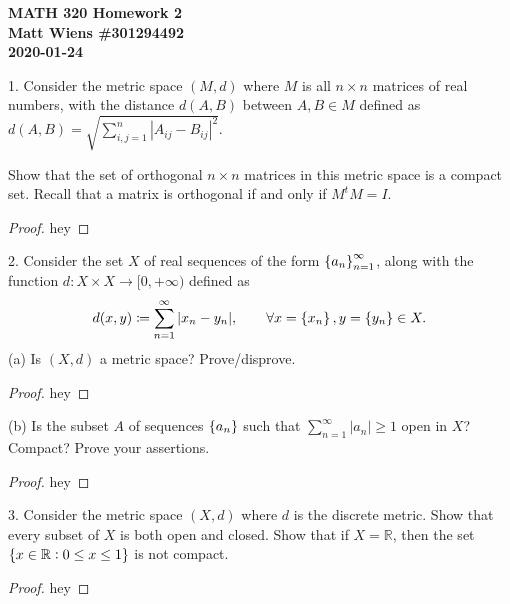 \documentclass{article}
\newcommand{\R}{\mathbb{R}}
\begin{document}
\textbf{MATH 320 Homework 2} \\
\textbf{Matt Wiens \#301294492} \\
\textbf{2020-01-24}

1. Consider the metric space $(M, d)$ where $M$ is all $n \times n$
matrices of real numbers, with the distance $d(A, B)$ between $A, B
\in M$ defined as $d(A, B)= \sqrt{\sum_{i, j = 1}^n |A_{i j} - B_{i j}|^2}$.

Show that the set of orthogonal $n \times n$ matrices in this metric
space is a compact set. Recall that a matrix is orthogonal if and only
if $M^t M = I$.

\begin{proof}

hey

\end{proof}

\newpage

2. Consider the set $X$ of real sequences of the form $\cbr{a_n}_{ n=
   1}^\infty$, along with the function $d: X \times X \rightarrow [0,
   +\infty)$ defined as
%
\begin{equation*}
    d(x, y) \coloneqq \sum_{n = 1}^\infty |x_n - y_n|,
    \qquad \forall x = \cbr{x_n}, y = \cbr{y_n} \in X
    .
\end{equation*}
%
(a) Is $(X,d)$ a metric space? Prove/disprove.

\begin{proof}

hey

\end{proof}

(b) Is the subset $A$ of sequences $\cbr{a_n}$ such that $\sum_{n =
1}^\infty |a_n| \geq 1$ open in $X$? Compact? Prove your assertions.

\begin{proof}

hey

\end{proof}

\newpage

3. Consider the metric space $(X, d)$ where $d$ is the discrete metric.
   Show that every subset of $X$ is both open and closed. Show that if
   $X = \R$, then the set $\cbr{x \in \R: 0 \leq x \leq 1}$ is not
   compact.

\begin{proof}

hey

\end{proof}
\end{document}
